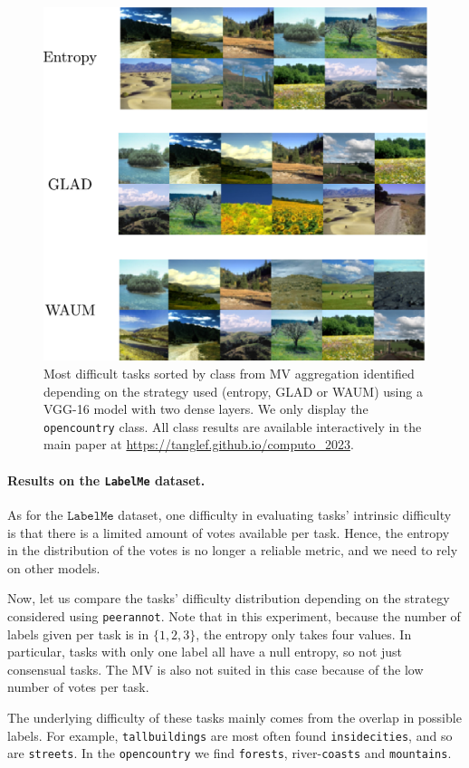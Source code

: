 \begin{figure}[htb]
    \centering
    \includegraphics[width=.8\textwidth]{./images_peerannot/labelme_identification.pdf}
    \caption{Most difficult tasks sorted by class from MV aggregation identified depending on the strategy used (entropy, GLAD or WAUM) using a VGG-16 model with two dense layers. We only display the \texttt{opencountry} class. All class results are available interactively in the main paper at \url{https://tanglef.github.io/computo_2023}.}
    \label{fig:identfication_labelme}
\end{figure}

\paragraph{Results on the \texttt{LabelMe} dataset.}

As for the $\texttt{LabelMe}$ dataset, one difficulty in evaluating tasks' intrinsic difficulty is that there is a limited amount of votes available per task.
Hence, the entropy in the distribution of the votes is no longer a reliable metric, and we need to rely on other models.

Now, let us compare the tasks' difficulty distribution depending on the strategy considered using \texttt{peerannot}.
Note that in this experiment, because the number of labels given per task is in $\{1,2,3\}$, the entropy only takes four values.
In particular, tasks with only one label all have a null entropy, so not just consensual tasks.
The MV is also not suited in this case because of the low number of votes per task.

The underlying difficulty of these tasks mainly comes from the overlap in possible labels. For example, \texttt{tallbuildings} are most often found \texttt{insidecities}, and so are \texttt{streets}. In the \texttt{opencountry} we find \texttt{forests}, river-\texttt{coasts} and \texttt{mountains}.

